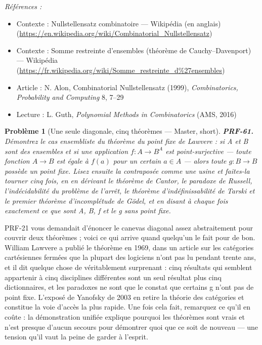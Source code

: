 \documentclass[11pt]{article}
\newtheorem{problem}{Problème}
\newenvironment{refs}{\par\small\noindent\emph{Références :}\begin{itemize}\setlength\itemsep{0pt}}{\end{itemize}\normalsize}
\begin{document}
\begin{refs}
\item Contexte : Nullstellensatz combinatoire --- Wikipédia (en anglais) (\url{https://en.wikipedia.org/wiki/Combinatorial_Nullstellensatz})
\item Contexte : Somme restreinte d'ensembles (théorème de Cauchy--Davenport) --- Wikipédia (\url{https://fr.wikipedia.org/wiki/Somme_restreinte_d%27ensembles})
\item Article : N. Alon, \og{} Combinatorial Nullstellensatz \fg{} (1999), \textit{Combinatorics, Probability and Computing} 8, 7--29
\item Lecture : L. Guth, \textit{Polynomial Methods in Combinatorics} (AMS, 2016)
\end{refs}

\bigskip

\begin{problem}[{Une seule diagonale, cinq théorèmes --- Master, short}]
\textbf{PRF-61.} Démontrez le cas ensembliste du théorème du point fixe
de Lawvere : si A et B sont des ensembles et si une application $ f\colon A \to B^{A} $ est
\textit{point-surjective} --- toute fonction $ A \to B $ est égale à $ f(a) $ pour un certain
$ a \in A $ --- alors toute $ g\colon B \to B $ possède un point fixe. Lisez ensuite la
contraposée comme une usine et faites-la tourner cinq fois, en en dérivant le théorème de
Cantor, le paradoxe de Russell, l'indécidabilité du problème de l'arrêt, le théorème
d'indéfinissabilité de Tarski et le premier théorème d'incomplétude de Gödel, et en disant à
chaque fois exactement ce que sont A, B, f et le g sans point fixe.
\end{problem}

\noindent PRF-21 vous demandait d'énoncer le canevas diagonal assez abstraitement
pour couvrir deux théorèmes ; voici ce qui arrive quand quelqu'un le fait pour de bon. William
Lawvere a publié le théorème en 1969, dans un article sur les catégories cartésiennes fermées
que la plupart des logiciens n'ont pas lu pendant trente ans, et il dit quelque chose de
véritablement surprenant : cinq résultats qui semblent appartenir à cinq disciplines
différentes sont un seul résultat plus cinq dictionnaires, et les \og{} paradoxes \fg{} ne sont que le
constat que certains g n'ont pas de point fixe. L'exposé de Yanofsky de 2003 en retire la
théorie des catégories et constitue la voie d'accès la plus rapide. Une fois cela fait,
remarquez ce qu'il en coûte : la démonstration unifiée explique pourquoi les théorèmes sont
vrais et n'est presque d'aucun secours pour démontrer quoi que ce soit de nouveau --- une
tension qu'il vaut la peine de garder à l'esprit.
\end{document}
